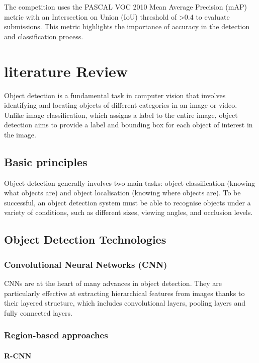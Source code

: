 \documentclass[12pt,oneside]{book} %
\begin{document}
The competition uses the PASCAL VOC 2010 Mean Average Precision (mAP) metric
with an Intersection on Union (IoU) threshold of >0.4 to evaluate submissions.
This metric highlights the importance of accuracy in the detection and
classification process.

\chapter{literature Review}

Object detection is a fundamental task in computer vision that involves
identifying and locating objects of different categories in an image or video.
Unlike image classification, which assigns a label to the entire image, object
detection aims to provide a label and bounding box for each object of interest
in the image.

\section{Basic principles}

Object detection generally involves two main tasks: object classification
(knowing what objects are) and object localisation (knowing where objects are).
To be successful, an object detection system must be able to recognise objects
under a variety of conditions, such as different sizes, viewing angles, and
occlusion levels.

\section{Object Detection Technologies}

\subsection{Convolutional Neural Networks (CNN)}

CNNs are at the heart of many advances in object detection. They are
particularly effective at extracting hierarchical features from images thanks
to their layered structure, which includes convolutional layers, pooling layers
and fully connected layers.

\subsection{Region-based approaches}

\subsubsection{R-CNN}
\end{document}
